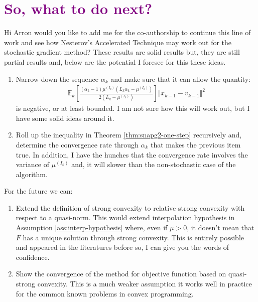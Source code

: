 \documentclass[12pt]{article}
\begin{document}
\section{\textcolor{purple}{So, what to do next?}}
    Hi Arron would you like to add me for the co-authorship to continue this line of work and see how Nesterov's Accelerated Technique may work out for the stochastic gradient method? 
    These results are solid results but, they are still partial results and, below are the potential I foresee for this these ideas. 
    \begin{enumerate}
        \item Narrow down the sequence $\alpha_k$ and make sure that it can allow the quantity: 
        \begin{align*}
            \mathbb E_k\left[
                    \frac{(\alpha_k - 1)\mu^{(I_k)}\left(L_k\alpha_k - \mu^{(I_k)}\right)}{2\left(L_k - \mu^{(I_k)}\right)}
                \right]\Vert x_{k - 1} - v_{k - 1} \Vert^2
        \end{align*}
        is negative, or at least bounded. I am not sure how this will work out, but I have some solid ideas around it. 
        \item Roll up the inequality in Theorem \ref{thm:snapg2-one-step} recursively and, determine the convergence rate through $\alpha_k$ that makes the previous item true. 
        In addition, I have the hunches that the convergence rate involves the variance of $\mu^{(I_k)}$ and, it will slower than the non-stochastic case of the algorithm. 
    \end{enumerate}
    For the future we can: 
    \begin{enumerate}
        \item Extend the definition of strong convexity to relative strong convexity with respect to a quasi-norm. This would extend interpolation hypothesis in Assumption \ref{ass:interp-hypothesis} where, even if $\mu > 0$, it doesn't mean that $F$ has a unique solution through strong convexity. This is entirely possible and appeared in the literatures before so, I can give you the words of confidence. 
        \item Show the convergence of the method for objective function based on quasi-strong convexity. This is a much weaker assumption it works well in practice for the common known problems in convex programming. 
    \end{enumerate}




\end{document}
